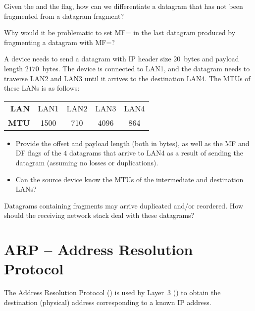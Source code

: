 \begin{exercise}
Given the  and the  flag, how can we differentiate 
a datagram that has not been fragmented from a datagram fragment?
\end{exercise}

\begin{exercise}
Why would it be problematic to set MF= in the last datagram 
produced by fragmenting a datagram with MF=?
\end{exercise}

\begin{exercise}
A device needs to send a datagram with IP header size $20$~bytes and payload length $2170$~bytes.
The device is connected to LAN1, and the datagram needs to traverse 
LAN2 and LAN3 until it arrives to the destination LAN4. The MTUs of these LANs is as follows:
\begin{center}
\begin{tabular}{r cccc}
\toprule
\textbf{LAN} & LAN1 & LAN2 & LAN3 & LAN4 \\
\textbf{MTU} & 1500 & 710  & 4096 & 864  \\
\bottomrule
\end{tabular}
\end{center}

\begin{itemize}
\item Provide the offset and payload length (both in bytes),
 as well as the MF and DF flags of the $4$ datagrams
 that arrive to LAN4 as a result of sending the datagram
 (assuming no losses or duplications).
  
\item Can the source device know the MTUs of the intermediate and destination 
LANs?
\end{itemize}

\end{exercise}


\begin{exercise}
Datagrams containing fragments may arrive duplicated and/or reordered. 
How should the receiving network stack deal with these datagrams?
\end{exercise}


\section{ARP -- Address Resolution Protocol}\label{sec:layer3:arp}

The Address Resolution Protocol () is used by Layer~3 ()
to obtain the destination  (physical) address corresponding to a known IP address.

